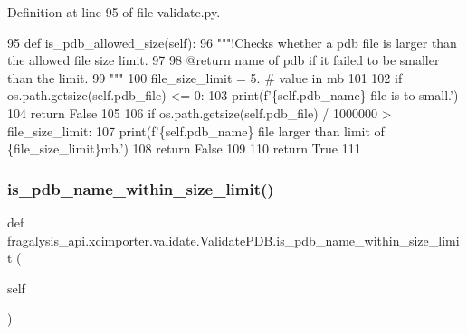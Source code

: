 Definition at line 95 of file validate.\+py.


\begin{DoxyCode}
95     \textcolor{keyword}{def }is\_pdb\_allowed\_size(self):
96         \textcolor{stringliteral}{"""!Checks whether a pdb file is larger than the allowed file size limit.}
97 \textcolor{stringliteral}{}
98 \textcolor{stringliteral}{        @return name of pdb if it failed to be smaller than the limit.}
99 \textcolor{stringliteral}{        """}
100         file\_size\_limit = 5.  \textcolor{comment}{# value in mb}
101 
102         \textcolor{keywordflow}{if} os.path.getsize(self.pdb\_file) <= 0:
103             print(f\textcolor{stringliteral}{'\{self.pdb\_name\} file is to small.'})
104             \textcolor{keywordflow}{return} \textcolor{keyword}{False}
105 
106         \textcolor{keywordflow}{if} os.path.getsize(self.pdb\_file) / 1000000 > file\_size\_limit:
107             print(f\textcolor{stringliteral}{'\{self.pdb\_name\} file larger than limit of \{file\_size\_limit\}mb.'})
108             \textcolor{keywordflow}{return} \textcolor{keyword}{False}
109 
110         \textcolor{keywordflow}{return} \textcolor{keyword}{True}
111 
\end{DoxyCode}
\mbox{\label{classfragalysis__api_1_1xcimporter_1_1validate_1_1_validate_p_d_b_a23b89548ce5a6619636348c711b7b27e}} 
\subsubsection{\texorpdfstring{is\+\_\+pdb\+\_\+name\+\_\+within\+\_\+size\+\_\+limit()}{is\_pdb\_name\_within\_size\_limit()}}
{\footnotesize\ttfamily def fragalysis\+\_\+api.\+xcimporter.\+validate.\+Validate\+P\+D\+B.\+is\+\_\+pdb\+\_\+name\+\_\+within\+\_\+size\+\_\+limit (\begin{DoxyParamCaption}\item[{}]{self }\end{DoxyParamCaption})}



